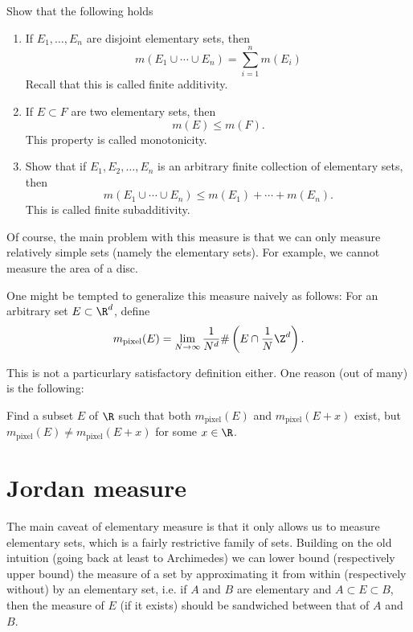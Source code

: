 \documentclass[lang=cn,11pt]{template}
\begin{document}
 Show that the following holds
\begin{enumerate}
\item If $E_1, \ldots, E_n$ are disjoint elementary sets, then 
$$
m(E_1 \cup \cdots \cup E_n)=\sum_{i=1}^n m(E_i)
$$
Recall that this is called finite additivity.

\item If $E\subset F$ are two elementary sets, then 
$$
m(E) \leq m(F).
$$ 
This property is called monotonicity.

\item Show that if $E_1, E_2, \ldots, E_n$ is an arbitrary finite collection of elementary sets, then 
$$
m(E_1\cup \cdots \cup E_n)\leq m(E_1) +\cdots+ m(E_n).
$$
This is called finite subadditivity.
 \end{enumerate}
 
 Of course, the main problem with this measure is that we can only measure relatively simple sets (namely the elementary sets). For example, we cannot measure the area of a disc. 

 One might be tempted to generalize this measure naively as follows: For an arbitrary set $E \subset \R^d$, define 
 $$
 m_{\mathrm{pixel}}(E)=\lim_{N\to \infty} \frac{1}{N^d}\# \left(E\cap \frac{1}{N} \Z^d\right).
 $$
 
This is not a particurlary satisfactory definition either. One reason (out of many) is the following: 
 
Find a subset $E$ of $\R$ such that both $m_{\mathrm{pixel}}(E)$ and $m_{\mathrm{pixel}}(E+x)$ exist, but $m_{\mathrm{pixel}}(E)\neq m_{\mathrm{pixel}}(E+x)$ for some $x\in \R$.



\newpage
\chapter{Jordan measure}


The main caveat of elementary measure is that it only allows us to measure elementary sets, which is a fairly restrictive family of sets. Building on the old intuition (going back at least to Archimedes) we can lower bound (respectively upper bound) the measure of a set by approximating it from within (respectively without) by an elementary set, i.e. if $A$ and $B$ are elementary and $A\subset E \subset B$, then the measure of $E$ (if it exists) should be sandwiched between that of $A$ and $B$. 
\end{document}
